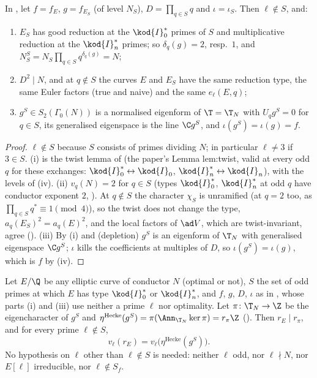 \begin{lemma}\label{lem:congruence:quant-setup}
In , let $f=f_E$, $g=f_{E_S}$ (of level $N_S$), $D=\prod_{q\in S}q$ and $\iota=\iota_S$. Then $\ell\notin S$, and:
\begin{enumerate}[label=(\roman*)]
\item $E_S$ has good reduction at the $\kod{I}_0^*$ primes of $S$ and multiplicative reduction at the $\kod{I}_n^*$ primes; so $\delta_q(g)=2$, resp.\ $1$, and $N_S^S=N_S\prod_{q\in S}q^{\delta_q(g)}=N$;
\item $D^2\mid N$, and at $q\notin S$ the curves $E$ and $E_S$ have the same reduction type, the same Euler factors (true and naive) and the same $e_\ell(E,q)$;
\item $g^S\in S_2(\Gamma_0(N))$ is a normalised eigenform of $\T=\T_N$ with $U_qg^S=0$ for $q\in S$, its generalised eigenspace is the line $\C g^S$, and $\iota(g^S)=\iota(g)=f$.
\end{enumerate}
\end{lemma}

\begin{proof}
$\ell\notin S$ because $S$ consists of primes dividing $N$; in particular $\ell\ne3$ if $3\in S$. (i) is the twist lemma of  (the paper's Lemma lem:twist, valid at every odd $q$ for
these exchanges: $\kod{I}_0^*\leftrightarrow\kod{I}_0$, $\kod{I}_n^*\leftrightarrow\kod{I}_n$), with the levels of (iv). (ii) $v_q(N)=2$ for $q\in S$ (types $\kod{I}_0^*$, $\kod{I}_n^*$ at odd $q$ have
conductor exponent $2$, ). At $q\notin S$ the character $\chi_S$ is unramified (at $q=2$ too, as $\prod_{q\in S}q^*\equiv1\pmod4$), so the twist does not change the type, $a_q(E_S)^2=a_q(E)^2$,
and the local factors of $\ad V$, which are twist-invariant, agree (). (iii) By (i) and  (depletion) $g^S$ is an eigenform of $\T_N$ with generalised eigenspace $\C g^S$;
$\iota$ kills the coefficients at multiples of $D$, so $\iota(g^S)=\iota(g)$, which is $f$ by (iv).
\end{proof}

\begin{lemma}\label{lem:congruence:quant-step1}
Let $E/\Q$ be any elliptic curve of conductor $N$ (optimal or not), $S$ the set of odd primes at which $E$ has type $\kod{I}_0^*$ or $\kod{I}_n^*$, and $f$, $g$, $D$, $\iota$ as in
, whose parts (i) and (iii) use neither a prime $\ell$ nor optimality. Let $\pi\colon\T_N\to\Z$ be the eigencharacter of $g^S$ and
$\eta^{\mathrm{Hecke}}(g^S)=\pi(\Ann_{\T_N}\ker\pi)=r_\pi\Z$ (). Then $r_E\mid r_\pi$, and for every prime $\ell\notin S$,
\[
v_\ell(r_E)=v_\ell\bigl(\eta^{\mathrm{Hecke}}(g^S)\bigr).
\]
No hypothesis on $\ell$ other than $\ell\notin S$ is needed: neither $\ell$ odd, nor $\ell\nmid N$, nor $E[\ell]$ irreducible, nor $\ell\notin S_f$.
\end{lemma}

